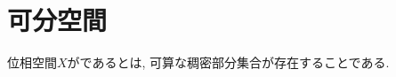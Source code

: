 \documentclass[uplatex, dvipdfmx, a4paper, 12pt, class=jsbook, crop=false]{standalone}
\begin{document}
\section{可分空間}
\label{sec:separable-spaces}

\begin{definition}
	位相空間$ X $がであるとは,
	可算な稠密部分集合が存在することである.
\end{definition}
\end{document}
